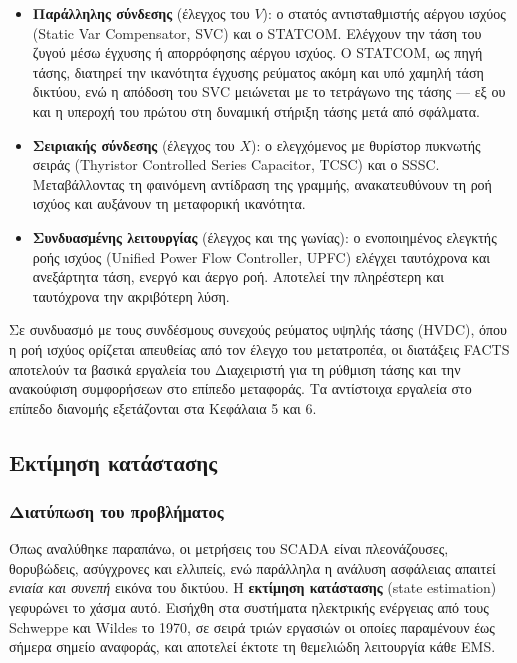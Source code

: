\begin{itemize}
\item \textbf{Παράλληλης σύνδεσης} (έλεγχος του $V$): ο στατός αντισταθμιστής αέργου ισχύος
      (Static Var Compensator, SVC) και ο STATCOM. Ελέγχουν την τάση του ζυγού μέσω έγχυσης
      ή απορρόφησης αέργου ισχύος. Ο STATCOM, ως πηγή τάσης, διατηρεί την ικανότητα έγχυσης
      ρεύματος ακόμη και υπό χαμηλή τάση δικτύου, ενώ η απόδοση του SVC μειώνεται με το
      τετράγωνο της τάσης — εξ ου και η υπεροχή του πρώτου στη δυναμική στήριξη τάσης μετά
      από σφάλματα.
\item \textbf{Σειριακής σύνδεσης} (έλεγχος του $X$): ο ελεγχόμενος με θυρίστορ πυκνωτής
      σειράς (Thyristor Controlled Series Capacitor, TCSC) και ο SSSC. Μεταβάλλοντας τη
      φαινόμενη αντίδραση της γραμμής, ανακατευθύνουν τη ροή ισχύος και αυξάνουν τη
      μεταφορική ικανότητα.
\item \textbf{Συνδυασμένης λειτουργίας} (έλεγχος και της γωνίας): ο ενοποιημένος ελεγκτής
      ροής ισχύος (Unified Power Flow Controller, UPFC) ελέγχει ταυτόχρονα και ανεξάρτητα
      τάση, ενεργό και άεργο ροή. Αποτελεί την πληρέστερη και ταυτόχρονα την ακριβότερη
      λύση.
\end{itemize}

Σε συνδυασμό με τους συνδέσμους συνεχούς ρεύματος υψηλής τάσης (HVDC), όπου η ροή ισχύος
ορίζεται απευθείας από τον έλεγχο του μετατροπέα, οι διατάξεις FACTS αποτελούν τα βασικά
εργαλεία του Διαχειριστή για τη ρύθμιση τάσης και την ανακούφιση συμφορήσεων στο επίπεδο
μεταφοράς. Τα αντίστοιχα εργαλεία στο επίπεδο διανομής εξετάζονται στα Κεφάλαια 5 και 6.

\subsection{Εκτίμηση κατάστασης}

\subsubsection*{Διατύπωση του προβλήματος}

Όπως αναλύθηκε παραπάνω, οι μετρήσεις του SCADA είναι πλεονάζουσες, θορυβώδεις, ασύγχρονες
και ελλιπείς, ενώ παράλληλα η ανάλυση ασφάλειας απαιτεί \emph{ενιαία και συνεπή} εικόνα του
δικτύου. Η \textbf{εκτίμηση κατάστασης} (state estimation) γεφυρώνει το χάσμα αυτό.
Εισήχθη στα συστήματα ηλεκτρικής ενέργειας από τους Schweppe και Wildes το 1970, σε σειρά
τριών εργασιών οι οποίες παραμένουν έως σήμερα σημείο αναφοράς, και αποτελεί έκτοτε τη
θεμελιώδη λειτουργία κάθε EMS.

